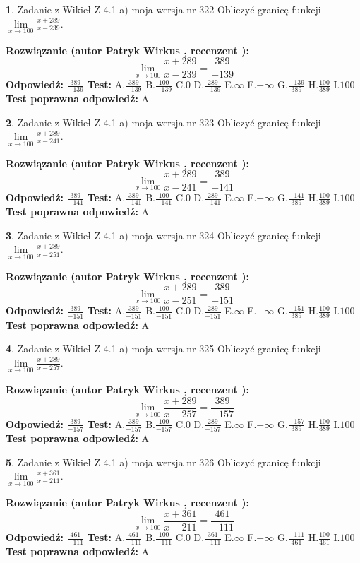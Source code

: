\documentclass[12pt, a4paper]{article}
\theoremstyle{definition} %
\newtheorem{zad}{}
\newcommand{\zadStart}[1]{\begin{zad}#1\newline}
\newcommand{\zadStop}{\end{zad}}
\newcommand{\rozwStart}[2]{\noindent \textbf{Rozwiązanie (autor #1 , recenzent #2): }\newline}
\newcommand{\rozwStop}{\newline}
\newcommand{\odpStart}{\noindent \textbf{Odpowiedź:}\newline}
\newcommand{\odpStop}{\newline}
\newcommand{\testStart}{\noindent \textbf{Test:}\newline}
\newcommand{\testStop}{\newline}
\newcommand{\kluczStart}{\noindent \textbf{Test poprawna odpowiedź:}\newline}
\newcommand{\kluczStop}{\newline}
\begin{document}
\zadStart{Zadanie z Wikieł Z 4.1 a) moja wersja nr 322}
Obliczyć granicę funkcji $\lim\limits_{x\to100}\frac{x+289}{x-239}$.
\zadStop
\rozwStart{Patryk Wirkus}{}
$$\lim\limits_{x\to100}\frac{x+289}{x-239} = \frac{389}{-139}$$
\rozwStop
\odpStart
$\frac{389}{-139}$
\odpStop
\testStart
A.$\frac{389}{-139}$
B.$\frac{100}{-139}$
C.$0$
D.$\frac{289}{-139}$
E.$\infty$
F.$-\infty$
G.$\frac{-139}{389}$
H.$\frac{100}{389}$
I.$100$
\testStop
\kluczStart
A
\kluczStop



\zadStart{Zadanie z Wikieł Z 4.1 a) moja wersja nr 323}
Obliczyć granicę funkcji $\lim\limits_{x\to100}\frac{x+289}{x-241}$.
\zadStop
\rozwStart{Patryk Wirkus}{}
$$\lim\limits_{x\to100}\frac{x+289}{x-241} = \frac{389}{-141}$$
\rozwStop
\odpStart
$\frac{389}{-141}$
\odpStop
\testStart
A.$\frac{389}{-141}$
B.$\frac{100}{-141}$
C.$0$
D.$\frac{289}{-141}$
E.$\infty$
F.$-\infty$
G.$\frac{-141}{389}$
H.$\frac{100}{389}$
I.$100$
\testStop
\kluczStart
A
\kluczStop



\zadStart{Zadanie z Wikieł Z 4.1 a) moja wersja nr 324}
Obliczyć granicę funkcji $\lim\limits_{x\to100}\frac{x+289}{x-251}$.
\zadStop
\rozwStart{Patryk Wirkus}{}
$$\lim\limits_{x\to100}\frac{x+289}{x-251} = \frac{389}{-151}$$
\rozwStop
\odpStart
$\frac{389}{-151}$
\odpStop
\testStart
A.$\frac{389}{-151}$
B.$\frac{100}{-151}$
C.$0$
D.$\frac{289}{-151}$
E.$\infty$
F.$-\infty$
G.$\frac{-151}{389}$
H.$\frac{100}{389}$
I.$100$
\testStop
\kluczStart
A
\kluczStop



\zadStart{Zadanie z Wikieł Z 4.1 a) moja wersja nr 325}
Obliczyć granicę funkcji $\lim\limits_{x\to100}\frac{x+289}{x-257}$.
\zadStop
\rozwStart{Patryk Wirkus}{}
$$\lim\limits_{x\to100}\frac{x+289}{x-257} = \frac{389}{-157}$$
\rozwStop
\odpStart
$\frac{389}{-157}$
\odpStop
\testStart
A.$\frac{389}{-157}$
B.$\frac{100}{-157}$
C.$0$
D.$\frac{289}{-157}$
E.$\infty$
F.$-\infty$
G.$\frac{-157}{389}$
H.$\frac{100}{389}$
I.$100$
\testStop
\kluczStart
A
\kluczStop



\zadStart{Zadanie z Wikieł Z 4.1 a) moja wersja nr 326}
Obliczyć granicę funkcji $\lim\limits_{x\to100}\frac{x+361}{x-211}$.
\zadStop
\rozwStart{Patryk Wirkus}{}
$$\lim\limits_{x\to100}\frac{x+361}{x-211} = \frac{461}{-111}$$
\rozwStop
\odpStart
$\frac{461}{-111}$
\odpStop
\testStart
A.$\frac{461}{-111}$
B.$\frac{100}{-111}$
C.$0$
D.$\frac{361}{-111}$
E.$\infty$
F.$-\infty$
G.$\frac{-111}{461}$
H.$\frac{100}{461}$
I.$100$
\testStop
\kluczStart
A
\kluczStop
\end{document}
